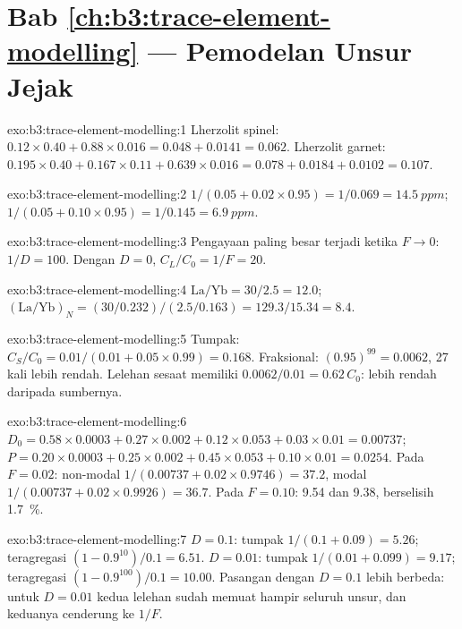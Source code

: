 \section*{Bab \ref{ch:b3:trace-element-modelling} --- Pemodelan Unsur Jejak}

\begin{solution}{exo:b3:trace-element-modelling:1}
Lherzolit spinel: $0.12\times0.40 + 0.88\times0.016 = 0.048 + 0.0141 =
0.062$. Lherzolit garnet: $0.195\times0.40 + 0.167\times0.11 +
0.639\times0.016 = 0.078 + 0.0184 + 0.0102 = 0.107$.
\end{solution}

\begin{solution}{exo:b3:trace-element-modelling:2}
$1/(0.05 + 0.02\times0.95) = 1/0.069 = \qty{14.5}{ppm}$;
$1/(0.05 + 0.10\times0.95) = 1/0.145 = \qty{6.9}{ppm}$.
\end{solution}

\begin{solution}{exo:b3:trace-element-modelling:3}
Pengayaan paling besar terjadi ketika $F \to 0$: $1/D = 100$. Dengan $D = 0$,
$C_L/C_0 = 1/F = 20$.
\end{solution}

\begin{solution}{exo:b3:trace-element-modelling:4}
$\mathrm{La/Yb} = 30/2.5 = 12.0$; $(\mathrm{La}/\mathrm{Yb})_N =
(30/0.232)/(2.5/0.163) = 129.3/15.34 = 8.4$.
\end{solution}

\begin{solution}{exo:b3:trace-element-modelling:5}
Tumpak: $C_S/C_0 = 0.01/(0.01 + 0.05\times0.99) = 0.168$. Fraksional:
$(0.95)^{99} = 0.0062$, 27 kali lebih rendah. Lelehan sesaat memiliki
$0.0062/0.01 = 0.62\,C_0$: lebih rendah daripada sumbernya.
\end{solution}

\begin{solution}{exo:b3:trace-element-modelling:6}
$D_0 = 0.58\times0.0003 + 0.27\times0.002 + 0.12\times0.053 + 0.03\times0.01
= 0.00737$; $P = 0.20\times0.0003 + 0.25\times0.002 + 0.45\times0.053 +
0.10\times0.01 = 0.0254$. Pada $F = 0.02$: non-modal $1/(0.00737 +
0.02\times0.9746) = 37.2$, modal $1/(0.00737 + 0.02\times0.9926) = 36.7$. Pada
$F = 0.10$: 9.54 dan 9.38, berselisih \qty{1.7}{\percent}.
\end{solution}

\begin{solution}{exo:b3:trace-element-modelling:7}
$D = 0.1$: tumpak $1/(0.1 + 0.09) = 5.26$; teragregasi $(1 - 0.9^{10})/0.1 =
6.51$. $D = 0.01$: tumpak $1/(0.01 + 0.099) = 9.17$; teragregasi
$(1 - 0.9^{100})/0.1 = 10.00$. Pasangan dengan $D = 0.1$ lebih berbeda: untuk
$D = 0.01$ kedua lelehan sudah memuat hampir seluruh unsur, dan keduanya cenderung ke
$1/F$.
\end{solution}


